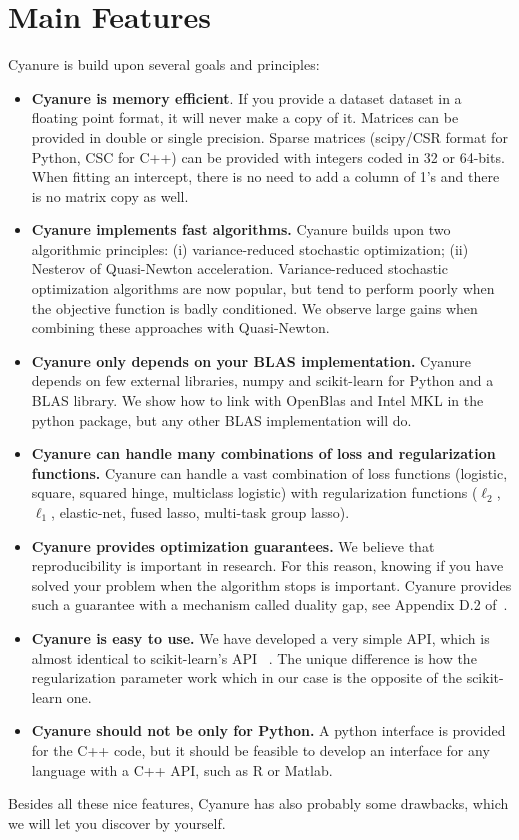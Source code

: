 \documentclass{article}
\begin{document}
\section{Main Features}
Cyanure is build upon several goals and principles:
\begin{itemize}
   \item {\textbf{Cyanure is memory efficient}}. If you provide a dataset dataset in a floating point format, it will never make a copy of it. Matrices can be provided in double or single precision. Sparse matrices (scipy/CSR format for Python, CSC for C++)
      can be provided with integers coded in 32 or 64-bits. When fitting an intercept, there is no need to add a column of 1's and there is no matrix copy as well. 
   \item {\textbf{Cyanure implements fast algorithms.}} Cyanure builds upon two algorithmic principles: (i) variance-reduced stochastic optimization; (ii) Nesterov of Quasi-Newton acceleration. Variance-reduced stochastic optimization algorithms are now popular, but tend to perform poorly when the objective function is badly conditioned. We observe large gains when combining these approaches with Quasi-Newton. 
   \item {\textbf{Cyanure only depends on your BLAS implementation.}} Cyanure depends on few external libraries, numpy and scikit-learn for Python and a BLAS library. We show how to link with OpenBlas and Intel MKL in the python package, but any other BLAS implementation will do.
   \item {\textbf{Cyanure can handle many combinations of loss and regularization functions.}} Cyanure can handle a vast combination of loss functions (logistic, square, squared hinge, multiclass logistic) with regularization functions ($\ell_2$, $\ell_1$, elastic-net, fused lasso, multi-task group lasso).
   \item {\textbf{Cyanure provides optimization guarantees.}} We believe that reproducibility is important in research. For this reason, knowing if you have solved your problem when the algorithm stops is important. Cyanure provides such a guarantee with a mechanism called duality gap, see Appendix D.2 of~\citet{mairal2010sparse}.
   \item {\textbf{Cyanure is easy to use.}} We have developed a very simple API, which is almost identical to scikit-learn's API ~\citep{scikit}. The unique difference is how the regularization parameter work which in our case is the opposite of the scikit-learn one.
   \item {\textbf{Cyanure should not be only for Python.}} A python interface is provided for the C++ code, but it should be feasible to develop an interface for any language with a C++ API, such as R or Matlab. 
\end{itemize}
Besides all these nice features, Cyanure has also probably some drawbacks, which we will let you discover by yourself.  
\end{document}

